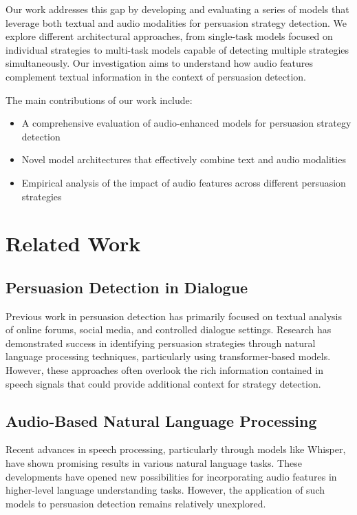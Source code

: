 \documentclass[10pt,twocolumn]{article}
\begin{document}
Our work addresses this gap by developing and evaluating a series of models that leverage both textual and audio modalities for persuasion strategy detection. We explore different architectural approaches, from single-task models focused on individual strategies to multi-task models capable of detecting multiple strategies simultaneously. Our investigation aims to understand how audio features complement textual information in the context of persuasion detection.

The main contributions of our work include:
\begin{itemize}
    \item A comprehensive evaluation of audio-enhanced models for persuasion strategy detection
    \item Novel model architectures that effectively combine text and audio modalities
    \item Empirical analysis of the impact of audio features across different persuasion strategies
\end{itemize}

\section{Related Work}
\subsection{Persuasion Detection in Dialogue}
Previous work in persuasion detection has primarily focused on textual analysis of online forums, social media, and controlled dialogue settings. Research has demonstrated success in identifying persuasion strategies through natural language processing techniques, particularly using transformer-based models. However, these approaches often overlook the rich information contained in speech signals that could provide additional context for strategy detection.

\subsection{Audio-Based Natural Language Processing}
Recent advances in speech processing, particularly through models like Whisper, have shown promising results in various natural language tasks. These developments have opened new possibilities for incorporating audio features in higher-level language understanding tasks. However, the application of such models to persuasion detection remains relatively unexplored.
\end{document}
